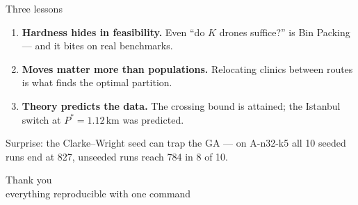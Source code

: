 \documentclass[aspectratio=169,10pt]{beamer}
\newcommand{\soft}[1]{{\small\color{ink2}#1}}
\begin{document}
\begin{frame}{Three lessons}
\vspace{4mm}
\begin{enumerate}\setlength{\itemsep}{10pt}
\item \textbf{Hardness hides in feasibility.} Even ``do $K$ drones suffice?'' is Bin Packing --- and it bites on real benchmarks.
\item \textbf{Moves matter more than populations.} Relocating clinics between routes is what finds the optimal partition.
\item \textbf{Theory predicts the data.} The crossing bound is attained; the Istanbul switch at $P^\ast=1.12$\,km was predicted.
\end{enumerate}
\vspace{6mm}
\soft{Surprise: the Clarke--Wright seed can trap the GA --- on A-n32-k5 all 10 seeded runs end at 827, unseeded runs reach 784 in 8 of 10.}
\end{frame}

\begin{frame}[standout]
Thank you\\[6pt]
{\normalsize everything reproducible with one command}
\end{frame}
\end{document}
